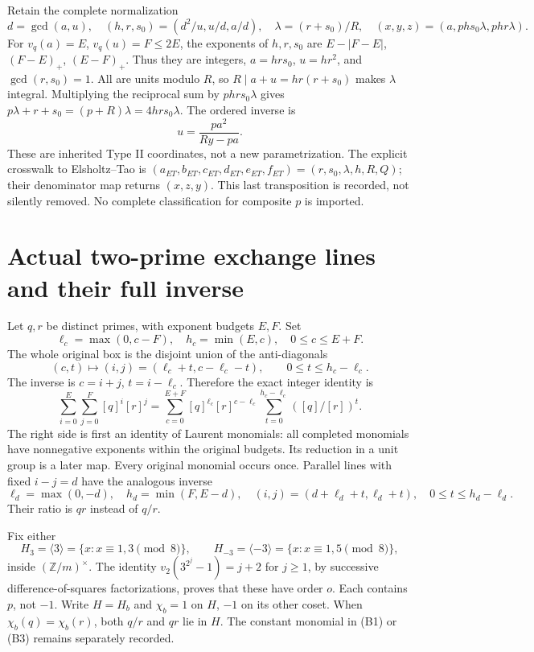 Retain the complete normalization
\[
 d=\gcd(a,u),\quad(h,r,s_0)=(d^2/u,u/d,a/d),\quad
 \lambda=(r+s_0)/R,\quad
 (x,y,z)=(a,phs_0\lambda,phr\lambda).                       \tag{A3}
\]
For $v_q(a)=E$, $v_q(u)=F\le2E$, the exponents of $h,r,s_0$ are
$E-|F-E|$, $(F-E)_+$, $(E-F)_+$. Thus they are integers,
$a=hrs_0$, $u=hr^2$, and $\gcd(r,s_0)=1$.
All are units modulo $R$, so $R\mid a+u=hr(r+s_0)$ makes $\lambda$ integral.
Multiplying the reciprocal sum by $phrs_0\lambda$ gives
$p\lambda+r+s_0=(p+R)\lambda=4hrs_0\lambda$.
The ordered inverse is
\[
 \boxed{u=\frac{pa^2}{Ry-pa}.}                              \tag{A4}
\]
These are inherited Type II coordinates, not a new parametrization.
The explicit crosswalk to Elsholtz--Tao \cite[Section 2, (2.13)--(2.22)]{ET}
is $(a_{ET},b_{ET},c_{ET},d_{ET},e_{ET},f_{ET})=(r,s_0,\lambda,h,R,Q)$;
their denominator map returns $(x,z,y)$. This last transposition is recorded,
not silently removed. No complete classification for composite $p$ is imported.

\section{Actual two-prime exchange lines and their full inverse}
Let $q,r$ be distinct primes, with exponent budgets $E,F$. Set
\[
 \ell_c=\max(0,c-F),\quad h_c=\min(E,c),\quad 0\le c\le E+F.
\]
The whole original box is the disjoint union of the anti-diagonals
\[
 (c,t)\longmapsto(i,j)=(\ell_c+t,c-\ell_c-t),\qquad
 0\le t\le h_c-\ell_c.                                    \tag{B1}
\]
The inverse is $c=i+j$, $t=i-\ell_c$. Therefore the exact integer identity is
\[
 \sum_{i=0}^{E}\sum_{j=0}^{F}[q]^i[r]^j
 =\sum_{c=0}^{E+F}[q]^{\ell_c}[r]^{c-\ell_c}
       \sum_{t=0}^{h_c-\ell_c}([q]/[r])^t.                 \tag{B2}
\]
The right side is first an identity of Laurent monomials: all completed
monomials have nonnegative exponents within the original budgets.
Its reduction in a unit group is a later map. Every original monomial occurs
once. Parallel lines with fixed $i-j=d$ have the analogous inverse
\[
 \ell_d=\max(0,-d),\quad h_d=\min(F,E-d),\quad
 (i,j)=(d+\ell_d+t,\ell_d+t),\quad 0\le t\le h_d-\ell_d.     \tag{B3}
\]
Their ratio is $qr$ instead of $q/r$.

Fix either
\[
 H_3=\langle3\rangle=\{x:x\equiv1,3\pmod8\},\qquad
 H_{-3}=\langle-3\rangle=\{x:x\equiv1,5\pmod8\},             \tag{B4}
\]
inside $(\mathbb Z/m)^\times$. The identity
$v_2(3^{2^j}-1)=j+2$ for $j\ge1$, by successive difference-of-squares
factorizations, proves that these have order $o$. Each contains $p$, not $-1$.
Write $H=H_b$ and $\chi_b=1$ on $H$, $-1$ on its other coset.
When $\chi_b(q)=\chi_b(r)$, both $q/r$ and $qr$ lie in $H$.
The constant monomial in (B1) or (B3) remains separately recorded.

